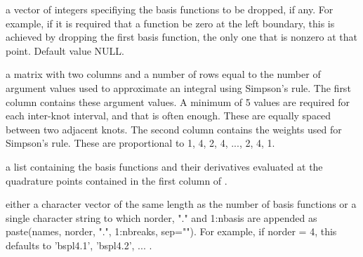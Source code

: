 \begin{Arguments}
\begin{ldescription}
\item[\code{dropind}] a vector of integers specifiying the basis functions to
be dropped, if any.  For example, if it is required that
a function be zero at the left boundary, this is achieved
by dropping the first basis function, the only one that
is nonzero at that point. Default value NULL.

\item[\code{quadvals}] a matrix with two columns and a number of rows equal to the number 
of argument values used to approximate an integral using Simpson's
rule.  The first column contains these argument values.
A minimum of 5 values are required for
each inter-knot interval, and that is often enough. These
are equally spaced between two adjacent knots.
The second column contains the weights used for Simpson's
rule.  These are proportional to 1, 4, 2, 4, ..., 2, 4, 1.

\item[\code{values}] a list containing the basis functions and their derivatives
evaluated at the quadrature points contained in the first
column of .

\item[\code{names}] either a character vector of the same length as the number of basis 
functions or a single character string to which norder, "." and
1:nbasis are appended as paste(names, norder, ".", 1:nbreaks,
sep="").  For example, if norder = 4, this defaults to 'bspl4.1',
'bspl4.2', ... .   

\end{ldescription}
\end{Arguments}
